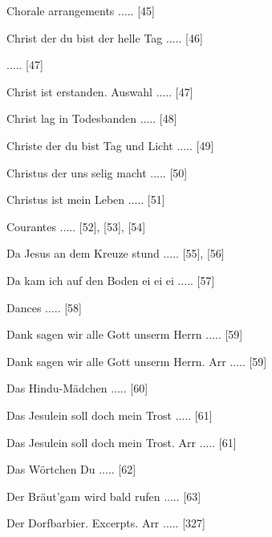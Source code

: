 \documentclass[twocolumn, 12pt]{book}
\begin{document}
\newline 
Chorale arrangements ..... [45]

\newline 
Christ der du bist der helle Tag ..... [46]

 ..... [47]

\newline 
Christ ist erstanden. Auswahl ..... [47]

\newline 
Christ lag in Todesbanden ..... [48]

\newline 
Christe der du bist Tag und Licht ..... [49]

\newline 
Christus der uns selig macht ..... [50]

\newline 
Christus ist mein Leben ..... [51]

\newline 
Courantes ..... [52], [53], [54]

\newline 
Da Jesus an dem Kreuze stund ..... [55], [56]

\newline 
Da kam ich auf den Boden ei ei ei ..... [57]

\newline 
Dances ..... [58]

\newline 
Dank sagen wir alle Gott unserm Herrn ..... [59]

\newline 
Dank sagen wir alle Gott unserm Herrn. Arr ..... [59]

\newline 
Das Hindu-Mädchen ..... [60]

\newline 
Das Jesulein soll doch mein Trost ..... [61]

\newline 
Das Jesulein soll doch mein Trost. Arr ..... [61]

\newline 
Das Wörtchen Du ..... [62]

\newline 
Der Bräut'gam wird bald rufen ..... [63]

\newline 
Der Dorfbarbier. Excerpts. Arr ..... [327]
\end{document}
